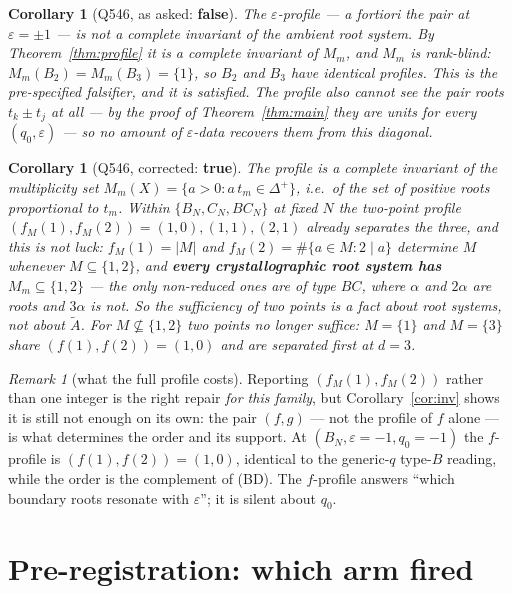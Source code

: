 \documentclass[11pt]{article}
\newtheorem{cor}[thm]{Corollary}
\theoremstyle{definition}
\theoremstyle{remark}
\newtheorem{rem}[thm]{Remark}
\newcommand{\At}{\widetilde{A}}
\begin{document}
\begin{cor}[Q546, as asked: \textbf{false}]\label{cor:q546no}
The $\varepsilon$-profile --- a fortiori the pair at $\varepsilon=\pm1$ --- is \emph{not} a
complete invariant of the ambient root system.  By Theorem~\ref{thm:profile} it is a
complete invariant of $M_m$, and $M_m$ is rank-blind: $M_m(B_2)=M_m(B_3)=\{1\}$, so $B_2$
and $B_3$ have identical profiles.  This is the pre-specified falsifier, and it is
satisfied.  The profile also cannot see the pair roots $t_k\pm t_j$ at all --- by the proof
of Theorem~\ref{thm:main} they are units for every $(q_0,\varepsilon)$ --- so no amount of
$\varepsilon$-data recovers them from this diagonal.
\end{cor}

\begin{cor}[Q546, corrected: \textbf{true}]\label{cor:q546yes}
The profile is a complete invariant of the multiplicity set $M_m(X)=\{a>0:a\,t_m\in\Delta^{+}\}$,
i.e.\ of the set of positive roots proportional to $t_m$.  Within
$\{B_N,C_N,BC_N\}$ at fixed $N$ the \emph{two}-point profile $(f_M(1),f_M(2))=(1,0),(1,1),(2,1)$
already separates the three, and this is not luck: $f_M(1)=|M|$ and $f_M(2)=\#\{a\in M: 2\mid a\}$
determine $M$ whenever $M\subseteq\{1,2\}$, and \textbf{every crystallographic root system has
$M_m\subseteq\{1,2\}$} --- the only non-reduced ones are of type $BC$, where $\alpha$ and
$2\alpha$ are roots and $3\alpha$ is not.  So the sufficiency of two points is a fact about
root systems, not about $\At$.  For $M\not\subseteq\{1,2\}$ two points no longer suffice:
$M=\{1\}$ and $M=\{3\}$ share $(f(1),f(2))=(1,0)$ and are separated first at $d=3$.
\end{cor}

\begin{rem}[what the full profile costs]
Reporting $(f_M(1),f_M(2))$ rather than one integer is the right repair \emph{for this
family}, but Corollary~\ref{cor:inv} shows it is still not enough on its own: the pair
$(f,g)$ --- not the profile of $f$ alone --- is what determines the order and its support.
At $(B_N,\varepsilon=-1,q_0=-1)$ the $f$-profile is $(f(1),f(2))=(1,0)$, identical to the
generic-$q$ type-$B$ reading, while the order is the complement of (BD).  The $f$-profile
answers ``which boundary roots resonate with $\varepsilon$''; it is silent about $q_0$.
\end{rem}

\section{Pre-registration: which arm fired}
\label{sec:prereg}
\end{document}
